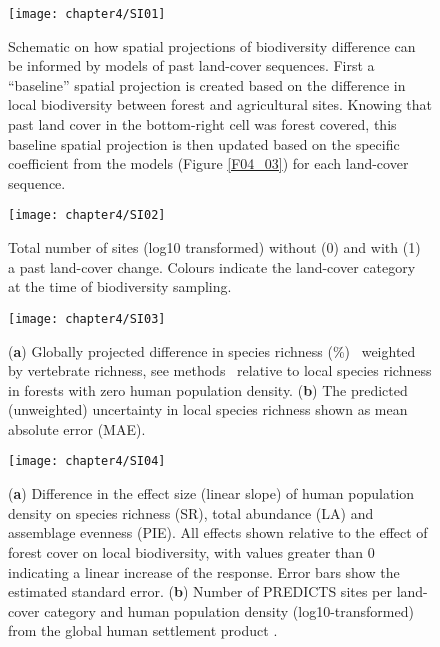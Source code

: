 \begin{figure}[htb]
\centering
\texttt{[image: chapter4/SI01]}
\caption{ Schematic on how spatial projections of biodiversity difference can be informed by models of past land-cover sequences. First a “baseline” spatial projection is created based on the difference in local biodiversity between forest and agricultural sites. Knowing that past land cover in the bottom-right cell was forest covered, this baseline spatial projection is then updated based on the specific coefficient from the models (Figure \ref{F04_03}) for each land-cover sequence. }
\label{SI04_01}
\end{figure}

\begin{figure}[htb]
\centering
\texttt{[image: chapter4/SI02]}
\caption{ Total number of sites (log10 transformed) without (0) and with (1) a past land-cover change. Colours indicate the land-cover category at the time of biodiversity sampling. }
\label{SI04_02}
\end{figure}

\begin{figure}[htb]
\centering
\texttt{[image: chapter4/SI03]}
\caption{ (\textbf{a}) Globally projected difference in species richness (\%) \textendash\ weighted by vertebrate richness, see methods \textendash\ relative to local species richness in forests with zero human population density. (\textbf{b}) The predicted (unweighted) uncertainty in local species richness shown as mean absolute error (MAE). }
\label{SI04_03}
\end{figure}

\begin{figure}[htb]
\centering
\texttt{[image: chapter4/SI04]}
\caption{ (\textbf{a}) Difference in the effect size (linear slope) of human population density on species richness (SR), total abundance (LA) and assemblage evenness (PIE). All effects shown relative to the effect of forest cover on local biodiversity, with values greater than 0 indicating a linear increase of the response. Error bars show the estimated standard error. (\textbf{b}) Number of PREDICTS sites per land-cover category and human population density (log10-transformed) from the global human settlement product \citep{Pesaresi2016}. }
\label{SI04_04}
\end{figure}

